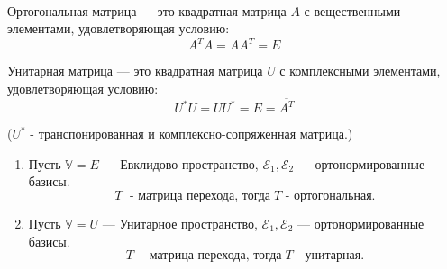 \begin{shdef}
    \begin{definition}
    \leavevmode \\

        Ортогональная матрица — это квадратная матрица $A$ с вещественными      элементами, удовлетворяющая условию: 
        $$A^T A = A A^T = E$$
        \nl 

        Унитарная матрица — это квадратная матрица $U$ с комплексными элементами, удовлетворяющая условию: 
        $$U^* U = U U^* = E = \overline{A^T}$$
        \nl

        ($ U^* $ - транспонированная и комплексно-сопряженная матрица.)
    \end{definition}
\end{shdef}

\begin{shth}
\begin{theorem}
    \begin{enumerate}
    \leavevmode \nl 
    
        \item Пусть $\mathbb{V} = E$ — Евклидово пространство, $\mathcal{E}_1, \mathcal{E}_2$ — ортонормированные базисы. 
              $$T \; \text{ - матрица перехода, тогда} \; T \text{ - ортогональная}.$$
        \item Пусть $\mathbb{V} = U$ — Унитарное пространство, $\mathcal{E}_1, \mathcal{E}_2$ — ортонормированные базисы. 
              $$T \; \text{ - матрица перехода, тогда} \; T \text{ - унитарная}.$$
    \end{enumerate}
\end{theorem}
\end{shth}

